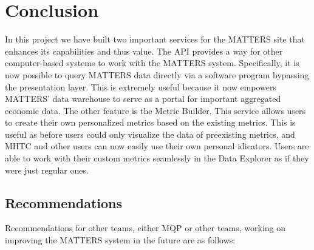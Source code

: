 
\chapter{Conclusion}

	In this project we have built two important services for the MATTERS site that enhances its capabilities and thus value. The API 
	provides a way for other computer-based systems to work with the MATTERS 
	system. Specifically, it is now possible to query MATTERS data directly via a software program 
	bypassing the presentation layer. This is extremely useful because it now empowers MATTERS' data warehouse to serve as a portal for important aggregated economic data.
	The other feature is the Metric Builder. 
	This service allows users to create their own personalized metrics based on 
	the existing metrics. This is useful as before users could only visualize the data of preexisting metrics, and MHTC and other users can now easily use their own personal idicators. 
	Users are able to work with their custom metrics seamlessly 
	in the Data Explorer as if they were just regular ones.  

	\section{Recommendations}
		
		Recommendations for other teams, either MQP or other teams, working on improving the MATTERS system in the future are as follows:
		
